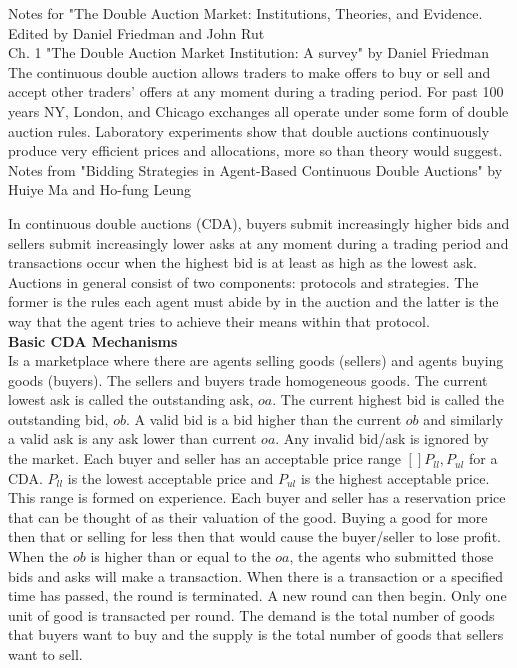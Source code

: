\documentclass[12pt,twoside]{reedthesis}
\begin{document}
Notes for "The Double Auction Market: Institutions, Theories, and Evidence. Edited by Daniel Friedman and John Rut\\

Ch. 1 "The Double Auction Market Institution: A survey" by Daniel Friedman \\

The continuous double auction allows traders to make offers to buy or sell and accept other traders' offers at any moment during a trading period. For past 100 years NY, London, and Chicago exchanges all operate under some form of double auction rules. Laboratory experiments show that double auctions continuously produce very efficient prices and allocations, more so than theory would suggest.\\

Notes from "Bidding Strategies in Agent-Based Continuous Double Auctions" by Huiye Ma and Ho-fung Leung

In continuous double auctions (CDA), buyers submit increasingly higher bids and sellers submit increasingly lower asks at any moment during a trading period and transactions occur when the highest bid is at least as high as the lowest ask. Auctions in general consist of two components: protocols and strategies. The former is the rules each agent must abide by in the auction and the latter is the way that the agent tries to achieve their means within that protocol.\\

\textbf{Basic CDA Mechanisms}\\
Is a marketplace where there are agents selling goods (sellers) and agents buying goods (buyers). The sellers and buyers trade homogeneous goods. The current lowest ask is called the outstanding ask, $oa$. The current highest bid is called the outstanding bid, $ob$. A valid bid is a bid higher than the current $ob$ and similarly a valid ask is any ask lower than current $oa$. Any invalid bid/ask is ignored by the market. Each buyer and seller has an acceptable price range $[]P_{ll}, P_{ul}$ for a CDA. $P_{ll}$ is the lowest acceptable price and $P_{ul}$ is the highest acceptable price. This range is formed on experience. Each buyer and seller has a reservation price that can be thought of as their valuation of the good. Buying a good for more then that or selling for less then that would cause the buyer/seller to lose profit. When the $ob$ is higher than or equal to the $oa$, the agents who submitted those bids and asks will make a transaction. When there is a transaction or a specified time has passed, the round is terminated. A new round can then begin. Only one unit of good is transacted per round. The demand is the total number of goods that buyers want to buy and the supply is the total number of goods that sellers want to sell.
\end{document}
